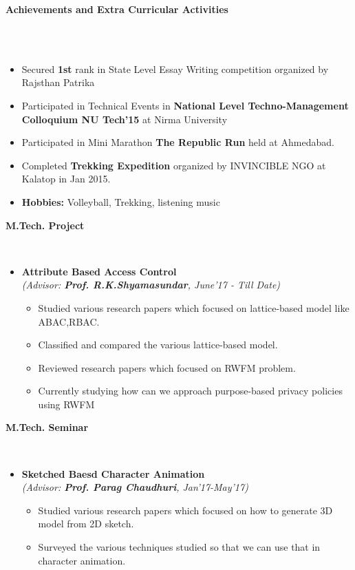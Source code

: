 \documentclass[a4paper,10pt]{article}
\newcommand{\isep}{-2 pt}
\newcommand{\lsep}{-0.5cm}
\newcommand{\resheading}[1]{{\small \colorbox{mygrey}{\begin{minipage}{0.975\textwidth}{\textbf{#1 \vphantom{p\^{E}}}}\end{minipage}}}}
\begin{document}
\resheading{\textbf{\large Achievements and Extra Curricular Activities}}\\[\lsep]\\[-0.3cm]
\begin{itemize}
  \item Secured \textbf{1st} rank in State Level Essay Writing competition organized by Rajsthan Patrika
  	\item Participated in Technical Events in\textbf{ National Level Techno-Management Colloquium  NU Tech'15 } at Nirma University
  	\item Participated in Mini Marathon \textbf{The Republic Run}  held at Ahmedabad.
  \item Completed \textbf{Trekking Expedition} organized by INVINCIBLE NGO at Kalatop in Jan 2015.
  \item \textbf{Hobbies:} Volleyball, Trekking, listening music
\end{itemize}


\resheading{\textbf{\large M.Tech. Project} }\\[\lsep]
\begin{itemize}
\item \textbf { Attribute Based Access Control}\\
 \emph{(Advisor: \textbf{Prof. R.K.Shyamasundar}, June'17 - Till Date)} \\[-0.6cm]
	\begin{itemize}\itemsep \isep
	\item Studied various research papers which focused on lattice-based model like ABAC,RBAC.
	\item  Classified and compared the various lattice-based model. 
	\item Reviewed research papers which focused on RWFM problem.
	\item Currently studying how can we approach purpose-based privacy policies using RWFM

	\end{itemize}

\end{itemize}



\resheading{\textbf{\large M.Tech. Seminar} }\\[\lsep]
\begin{itemize}
\item \textbf{ Sketched Baesd Character Animation
} \\
 \emph{(Advisor: \textbf{Prof. Parag Chaudhuri}, Jan’17-May’17)} \\[-0.6cm]
	\begin{itemize}\itemsep \isep
	\item Studied various research papers which focused on how to generate 3D model from 2D sketch.
 	\item Surveyed  the various  techniques studied  so that we can use that in character animation.

	\end{itemize}
\end{itemize}
\end{document}
